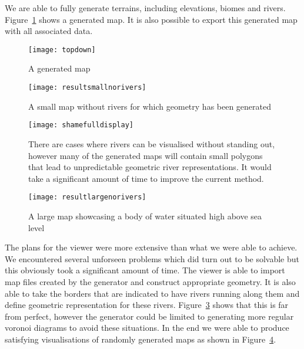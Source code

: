 
We are able to fully generate terrains, including elevations, biomes and rivers.
Figure~\ref{fig:generator} shows a generated map. It is also possible to export this generated map with all associated data.

\begin{figure}[H]
	\centering
	\texttt{[image: topdown]}
	\caption{A generated map}
	\label{fig:generator}
\end{figure}

\begin{figure}[H]
	\centering
	\texttt{[image: resultsmallnorivers]}
	\caption{A small map without rivers for which geometry has been generated}
	\label{fig:resultsmall}
\end{figure}

\begin{figure}[H]
	\centering
	\texttt{[image: shamefulldisplay]}
	\caption{There are cases where rivers can be visualised without standing out, however many of the generated maps will contain small polygons that lead to unpredictable geometric river representations. It would take a significant amount of time to improve the current method.}
	\label{fig:resultsriver}
\end{figure}

\begin{figure}[H]
	\centering
	\texttt{[image: resultlargenorivers]}
	\caption{A large map showcasing a body of water situated high above sea level}
	\label{fig:resultslarge}
\end{figure}

The plans for the viewer were more extensive than what we were able to achieve. We encountered several unforseen problems which did turn out to be solvable but this obviously took a significant amount of time. The viewer is able to import map files created by the generator and construct appropriate geometry. It is also able to take the borders that are indicated to have rivers running along them and define geometric representation for these rivers. Figure~\ref{fig:resultsriver} shows that this is far from perfect, however the generator could be limited to generating more regular voronoi diagrams to avoid these situations. In the end we were able to produce satisfying visualisations of randomly generated maps as shown in Figure~\ref{fig:resultslarge}.